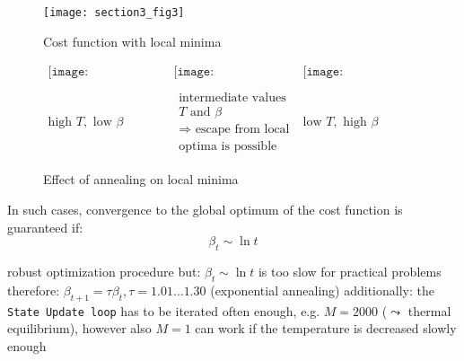 \begin{figure}[h]
  \centering
\texttt{[image: section3\_fig3]}  
  \caption{Cost function with local minima}
  \label{fig:localMinima}
\end{figure}
\begin{figure}[h]
  \centering
\[ \begin{array}{ccc}
	\texttt{[image: section3\_fig4]}
	& \texttt{[image: section3\_fig5]}
	& \texttt{[image: section3\_fig6]} \\\\
	\text{high } T, \text{ low } \beta 
	& \substack{	\text{intermediate values for} \\
			T \text{ and } \beta \\
			\Rightarrow \text{ escape from local} \\
			\text{optima is possible}}
	& \text{low } T, \text{ high } \beta
\end{array} \]
  
  \caption{Effect of annealing on local minima}
\end{figure}
In such cases, convergence to the global optimum of the cost function
is guaranteed if:
\begin{equation}
	\beta_t \sim \ln t
\end{equation}
\begin{itemize}
	\itR robust optimization procedure
	\itR but: $\beta_t \sim \ln t$ is too slow for practical problems
	\itR therefore: $\beta_{t+1} = \tau \beta_t, \tau = 1.01 \ldots 1.30$
		(exponential annealing)
	\itR additionally: the \texttt{State Update loop} has to be iterated often enough, e.g. $M=2000$ ($\leadsto$ thermal equilibrium), 
	however also $M=1$ can work if the temperature is decreased slowly enough
\end{itemize}


\newpage 						%
